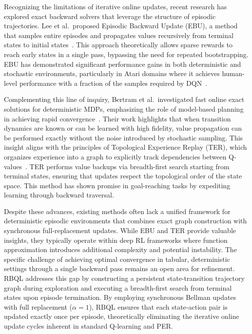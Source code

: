 \documentclass[manuscript, screen, review]{jair}
\begin{document}
Recognizing the limitations of iterative online updates, recent research has explored exact backward solvers that leverage the structure of episodic trajectories. Lee et al.\ proposed Episodic Backward Update (EBU), a method that samples entire episodes and propagates values recursively from terminal states to initial states~\cite{Lee2018SampleEfficientDR}. This approach theoretically allows sparse rewards to reach early states in a single pass, bypassing the need for repeated bootstrapping. EBU has demonstrated significant performance gains in both deterministic and stochastic environments, particularly in Atari domains where it achieves human-level performance with a fraction of the samples required by DQN~\cite{Lee2018SampleEfficientDR}.

Complementing this line of inquiry, Bertram et al.\ investigated fast online exact solutions for deterministic MDPs, emphasizing the role of model-based planning in achieving rapid convergence~\cite{Bertram2018FastOnlineExact}. Their work highlights that when transition dynamics are known or can be learned with high fidelity, value propagation can be performed exactly without the noise introduced by stochastic sampling. This insight aligns with the principles of Topological Experience Replay (TER), which organizes experience into a graph to explicitly track dependencies between Q-values~\cite{Hong2022TopologicalER}. TER performs value backups via breadth-first search starting from terminal states, ensuring that updates respect the topological order of the state space. This method has shown promise in goal-reaching tasks by expediting learning through backward traversal.

Despite these advances, existing methods often lack a unified framework for deterministic episodic environments that combines exact graph construction with synchronous full-replacement updates. While EBU and TER provide valuable insights, they typically operate within deep RL frameworks where function approximation introduces additional complexity and potential instability. The specific challenge of achieving optimal convergence in tabular, deterministic settings through a single backward pass remains an open area for refinement. RBQL addresses this gap by constructing a persistent state-transition trajectory graph during exploration and executing a breadth-first search from terminal states upon episode termination. By employing synchronous Bellman updates with full replacement ($\alpha=1$), RBQL ensures that each state-action pair is updated exactly once per episode, theoretically eliminating the iterative online update cycles inherent in standard Q-learning and PER.
\end{document}
